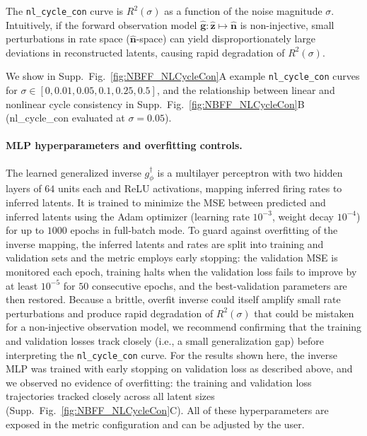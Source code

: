 \documentclass{article}
\begin{document}
\noindent
The \texttt{nl\_cycle\_con} curve is $R^2(\sigma)$ as a function of the noise magnitude $\sigma$. Intuitively, if the forward observation model $\mathbf{\hat{g}}:\hat{\mathbf{z}}\mapsto \hat{\mathbf{n}}$ is non-injective, small perturbations in rate space ($\hat{\mathbf{n}}$-space) can yield disproportionately large deviations in reconstructed latents, causing rapid degradation of $R^2(\sigma)$.

We show in Supp.\ Fig.~\ref{fig:NBFF_NLCycleCon}A example \texttt{nl\_cycle\_con} curves for $\sigma \in [0, 0.01, 0.05, 0.1, 0.25, 0.5]$, and the relationship between linear and nonlinear cycle consistency in Supp.\ Fig.~\ref{fig:NBFF_NLCycleCon}B (nl\_cycle\_con evaluated at $\sigma = 0.05$).

\paragraph{MLP hyperparameters and overfitting controls.}
The learned generalized inverse $g^\dagger_\phi$ is a multilayer perceptron with two hidden layers of $64$ units each and ReLU activations, mapping inferred firing rates to inferred latents. It is trained to minimize the MSE between predicted and inferred latents using the Adam optimizer (learning rate $10^{-3}$, weight decay $10^{-4}$) for up to $1000$ epochs in full-batch mode. To guard against overfitting of the inverse mapping, the inferred latents and rates are split into training and validation sets and the metric employs early stopping: the validation MSE is monitored each epoch, training halts when the validation loss fails to improve by at least $10^{-5}$ for $50$ consecutive epochs, and the best-validation parameters are then restored. Because a brittle, overfit inverse could itself amplify small rate perturbations and produce rapid degradation of $R^2(\sigma)$ that could be mistaken for a non-injective observation model, we recommend confirming that the training and validation losses track closely (i.e., a small generalization gap) before interpreting the \texttt{nl\_cycle\_con} curve. For the results shown here, the inverse MLP was trained with early stopping on validation loss as described above, and we observed no evidence of overfitting: the training and validation loss trajectories tracked closely across all latent sizes (Supp.\ Fig.~\ref{fig:NBFF_NLCycleCon}C). All of these hyperparameters are exposed in the metric configuration and can be adjusted by the user.
\end{document}
